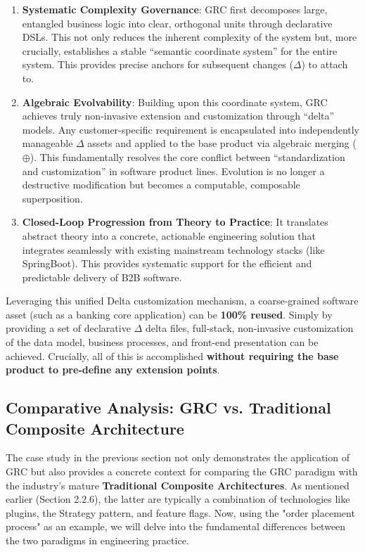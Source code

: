 \documentclass[11pt]{article}
\begin{document}
\begin{enumerate}
    \item \textbf{Systematic Complexity Governance}: GRC first decomposes large, entangled business logic into clear, orthogonal units through declarative DSLs. This not only reduces the inherent complexity of the system but, more crucially, establishes a stable ``semantic coordinate system'' for the entire system. This provides precise anchors for subsequent changes ($\Delta$) to attach to.

    \item \textbf{Algebraic Evolvability}: Building upon this coordinate system, GRC achieves truly non-invasive extension and customization through ``delta'' models. Any customer-specific requirement is encapsulated into independently manageable $\Delta$ assets and applied to the base product via algebraic merging ($\oplus$). This fundamentally resolves the core conflict between ``standardization and customization'' in software product lines. Evolution is no longer a destructive modification but becomes a computable, composable superposition.

    \item \textbf{Closed-Loop Progression from Theory to Practice}: It translates abstract theory into a concrete, actionable engineering solution that integrates seamlessly with existing mainstream technology stacks (like SpringBoot). This provides systematic support for the efficient and predictable delivery of B2B software.
\end{enumerate}

Leveraging this unified Delta customization mechanism, a coarse-grained software asset (such as a banking core application) can be \textbf{100\% reused}. Simply by providing a set of declarative $\Delta$ delta files, full-stack, non-invasive customization of the data model, business processes, and front-end presentation can be achieved. Crucially, all of this is accomplished \textbf{without requiring the base product to pre-define any extension points}.

\subsection{Comparative Analysis: GRC vs. Traditional Composite Architecture}

The case study in the previous section not only demonstrates the application of GRC but also provides a concrete context for comparing the GRC paradigm with the industry's mature \textbf{Traditional Composite Architectures}. As mentioned earlier (Section 2.2.6), the latter are typically a combination of technologies like plugins, the Strategy pattern, and feature flags. Now, using the "order placement process" as an example, we will delve into the fundamental differences between the two paradigms in engineering practice.
\end{document}

